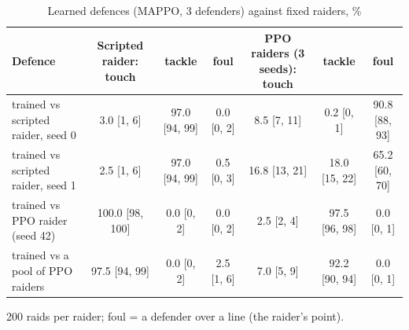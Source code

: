 \begin{table}[t]
\centering
\caption{Learned defences (MAPPO, 3 defenders) against fixed raiders, \%}
\label{tab:T7_learned_defences}
\begin{tabular}{lcccccc}
\toprule
Defence & Scripted raider: touch & tackle & foul & PPO raiders (3 seeds): touch & tackle & foul \\
\midrule
trained vs scripted raider, seed 0 & 3.0 [1, 6] & 97.0 [94, 99] & 0.0 [0, 2] & 8.5 [7, 11] & 0.2 [0, 1] & 90.8 [88, 93] \\
trained vs scripted raider, seed 1 & 2.5 [1, 6] & 97.0 [94, 99] & 0.5 [0, 3] & 16.8 [13, 21] & 18.0 [15, 22] & 65.2 [60, 70] \\
trained vs PPO raider (seed 42) & 100.0 [98, 100] & 0.0 [0, 2] & 0.0 [0, 2] & 2.5 [2, 4] & 97.5 [96, 98] & 0.0 [0, 1] \\
trained vs a pool of PPO raiders & 97.5 [94, 99] & 0.0 [0, 2] & 2.5 [1, 6] & 7.0 [5, 9] & 92.2 [90, 94] & 0.0 [0, 1] \\
\bottomrule
\end{tabular}
\par\smallskip\footnotesize 200 raids per raider; foul = a defender over a line (the raider's point).
\end{table}
